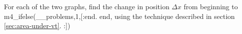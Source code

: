 For each of the two graphs, find the change in position $\Delta x$ from
beginning to
m4_ifelse(__problems,1,[:end.%
end, using the technique described in section \ref{sec:area-under-vt}.%
:])%
\answercheck

